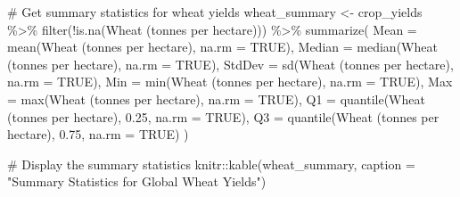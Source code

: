 \documentclass[
  letterpaper,
]{book}
\newenvironment{Shaded}{\begin{snugshade}}{\end{snugshade}}
\newcommand{\AttributeTok}[1]{\textcolor[rgb]{0.40,0.45,0.13}{#1}}
\newcommand{\CommentTok}[1]{\textcolor[rgb]{0.37,0.37,0.37}{#1}}
\newcommand{\ConstantTok}[1]{\textcolor[rgb]{0.56,0.35,0.01}{#1}}
\newcommand{\FloatTok}[1]{\textcolor[rgb]{0.68,0.00,0.00}{#1}}
\newcommand{\FunctionTok}[1]{\textcolor[rgb]{0.28,0.35,0.67}{#1}}
\newcommand{\NormalTok}[1]{\textcolor[rgb]{0.00,0.23,0.31}{#1}}
\newcommand{\OtherTok}[1]{\textcolor[rgb]{0.00,0.23,0.31}{#1}}
\newcommand{\SpecialCharTok}[1]{\textcolor[rgb]{0.37,0.37,0.37}{#1}}
\newcommand{\StringTok}[1]{\textcolor[rgb]{0.13,0.47,0.30}{#1}}
\begin{document}
\begin{Shaded}
\begin{Highlighting}[]
\CommentTok{\# Get summary statistics for wheat yields}
\NormalTok{wheat\_summary }\OtherTok{\textless{}{-}}\NormalTok{ crop\_yields }\SpecialCharTok{\%\textgreater{}\%}
  \FunctionTok{filter}\NormalTok{(}\SpecialCharTok{!}\FunctionTok{is.na}\NormalTok{(}\StringTok{\textasciigrave{}}\AttributeTok{Wheat (tonnes per hectare)}\StringTok{\textasciigrave{}}\NormalTok{)) }\SpecialCharTok{\%\textgreater{}\%}
  \FunctionTok{summarize}\NormalTok{(}
    \AttributeTok{Mean =} \FunctionTok{mean}\NormalTok{(}\StringTok{\textasciigrave{}}\AttributeTok{Wheat (tonnes per hectare)}\StringTok{\textasciigrave{}}\NormalTok{, }\AttributeTok{na.rm =} \ConstantTok{TRUE}\NormalTok{),}
    \AttributeTok{Median =} \FunctionTok{median}\NormalTok{(}\StringTok{\textasciigrave{}}\AttributeTok{Wheat (tonnes per hectare)}\StringTok{\textasciigrave{}}\NormalTok{, }\AttributeTok{na.rm =} \ConstantTok{TRUE}\NormalTok{),}
    \AttributeTok{StdDev =} \FunctionTok{sd}\NormalTok{(}\StringTok{\textasciigrave{}}\AttributeTok{Wheat (tonnes per hectare)}\StringTok{\textasciigrave{}}\NormalTok{, }\AttributeTok{na.rm =} \ConstantTok{TRUE}\NormalTok{),}
    \AttributeTok{Min =} \FunctionTok{min}\NormalTok{(}\StringTok{\textasciigrave{}}\AttributeTok{Wheat (tonnes per hectare)}\StringTok{\textasciigrave{}}\NormalTok{, }\AttributeTok{na.rm =} \ConstantTok{TRUE}\NormalTok{),}
    \AttributeTok{Max =} \FunctionTok{max}\NormalTok{(}\StringTok{\textasciigrave{}}\AttributeTok{Wheat (tonnes per hectare)}\StringTok{\textasciigrave{}}\NormalTok{, }\AttributeTok{na.rm =} \ConstantTok{TRUE}\NormalTok{),}
    \AttributeTok{Q1 =} \FunctionTok{quantile}\NormalTok{(}\StringTok{\textasciigrave{}}\AttributeTok{Wheat (tonnes per hectare)}\StringTok{\textasciigrave{}}\NormalTok{, }\FloatTok{0.25}\NormalTok{, }\AttributeTok{na.rm =} \ConstantTok{TRUE}\NormalTok{),}
    \AttributeTok{Q3 =} \FunctionTok{quantile}\NormalTok{(}\StringTok{\textasciigrave{}}\AttributeTok{Wheat (tonnes per hectare)}\StringTok{\textasciigrave{}}\NormalTok{, }\FloatTok{0.75}\NormalTok{, }\AttributeTok{na.rm =} \ConstantTok{TRUE}\NormalTok{)}
\NormalTok{  )}

\CommentTok{\# Display the summary statistics}
\NormalTok{knitr}\SpecialCharTok{::}\FunctionTok{kable}\NormalTok{(wheat\_summary, }\AttributeTok{caption =} \StringTok{"Summary Statistics for Global Wheat Yields"}\NormalTok{)}
\end{Highlighting}
\end{Shaded}
\end{document}
